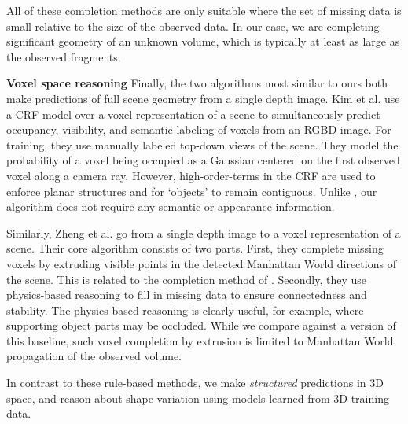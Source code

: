 \documentclass[10pt,twocolumn,letterpaper]{article}
\makeatletter
\newcommand*{\ea}{et al.\@\xspace}
\renewcommand{\paragraph}{\vspace{2pt}\noindent\textbf}
\makeatother
\begin{document}
All of these completion methods are only suitable where the set of missing data is small relative to the size of the observed data.
In our case, we are completing significant geometry of an unknown volume, which is typically at least as large as the observed fragments.


\paragraph{Voxel space reasoning}\newline
Finally, the two algorithms most similar to ours both make predictions of full scene geometry from a single depth image.
Kim \ea \cite{kim-iccv-2013} use a CRF model over a voxel representation of a scene to simultaneously predict occupancy, visibility, and semantic labeling of voxels from an RGBD image.
For training, they use manually labeled top-down views of the scene.
They model the probability of a voxel being occupied as a Gaussian centered on the first observed voxel along a camera ray.
However, high-order-terms in the CRF are used to enforce planar structures and for `objects' to remain contiguous.
Unlike \cite{kim-iccv-2013}, our algorithm does not require any semantic or appearance information.

Similarly,  Zheng \ea \cite{zheng-cvpr-2013} go from a single depth image to a voxel representation of a scene.
Their core algorithm consists of two parts.
First, they complete missing voxels by extruding visible points in the detected Manhattan World directions of the scene.
This is related to the completion method of \cite{kroemer-humanoids-2012}.
Secondly, they use physics-based reasoning to fill in missing data to ensure connectedness and stability.
The physics-based reasoning is clearly useful, for example, where supporting object parts may be occluded.
While we compare against a version of this baseline, such voxel completion by extrusion is limited to Manhattan World propagation of the observed volume.

In contrast to these rule-based methods, we make \emph{structured} predictions in 3D space, and reason about shape variation using models learned from 3D training data.


\end{document}
